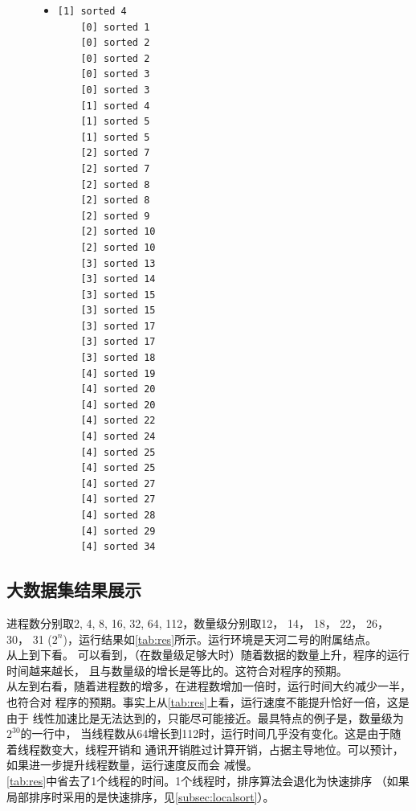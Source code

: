 \documentclass[a4paper]{article}
\begin{document}
\begin{figure}[!hbt]
\begin{itemize}
\item[] \begin{lstlisting}[style=mycpp, label=lst:5-t, caption=5线程结果]
    [1] sorted 4
    [0] sorted 1
    [0] sorted 2
    [0] sorted 2
    [0] sorted 3
    [0] sorted 3
    [1] sorted 4
    [1] sorted 5
    [1] sorted 5
    [2] sorted 7
    [2] sorted 7
    [2] sorted 8
    [2] sorted 8
    [2] sorted 9
    [2] sorted 10
    [2] sorted 10
    [3] sorted 13
    [3] sorted 14
    [3] sorted 15
    [3] sorted 15
    [3] sorted 17
    [3] sorted 17
    [3] sorted 18
    [4] sorted 19
    [4] sorted 20
    [4] sorted 20
    [4] sorted 22
    [4] sorted 24
    [4] sorted 25
    [4] sorted 25
    [4] sorted 27
    [4] sorted 27
    [4] sorted 28
    [4] sorted 29
    [4] sorted 34
\end{lstlisting}
\end{itemize}
\end{figure}

\subsection{大数据集结果展示}
进程数分别取2, 4, 8, 16, 32, 64, 112，数量级分别取12， 14， 18， 22， 26， 30， 31
($2^n$)，运行结果如\autoref{tab:res}所示。运行环境是天河二号的附属结点。\\


从上到下看。
可以看到，（在数量级足够大时）随着数据的数量上升，程序的运行时间越来越长，
且与数量级的增长是等比的。这符合对程序的预期。\\

从左到右看，随着进程数的增多，在进程数增加一倍时，运行时间大约减少一半，也符合对
程序的预期。事实上从\autoref{tab:res}上看，运行速度不能提升恰好一倍，这是由于
线性加速比是无法达到的，只能尽可能接近。最具特点的例子是，数量级为$2^{30}$的一行中，
当线程数从64增长到112时，运行时间几乎没有变化。这是由于随着线程数变大，线程开销和
通讯开销胜过计算开销，占据主导地位。可以预计，如果进一步提升线程数量，运行速度反而会
减慢。\\

\autoref{tab:res}中省去了1个线程的时间。1个线程时，排序算法会退化为快速排序
（如果局部排序时采用的是快速排序，见\autoref{subsec:localsort}）。\\
\end{document}
